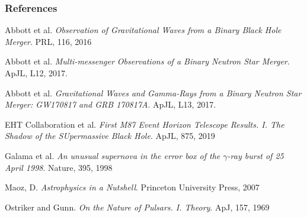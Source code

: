 \documentclass{beamer}
\begin{document}
\begin{frame}[allowframebreaks]
  \frametitle<presentation>{References}    
  \scriptsize
  \begin{thebibliography}{10}    

  \beamertemplatebookbibitems
    Abbott et al. {\em Observation of Gravitational Waves from a Binary Black Hole Merger}. PRL, 116, 2016
  \beamertemplatearticlebibitems

  \beamertemplatebookbibitems
    Abbott et al. {\em Multi-messenger Observations of a Binary Neutron Star Merger}.
    ApJL, L12, 2017.
  \beamertemplatearticlebibitems

  \beamertemplatebookbibitems
    Abbott et al. {\em Gravitational Waves and Gamma-Rays from a Binary Neutron Star Merger: GW170817 and GRB 170817A}. ApJL, L13, 2017.
  \beamertemplatearticlebibitems

  \beamertemplatebookbibitems
    EHT Collaboration et al.  {\em First M87 Event Horizon Telescope Results. I. The Shadow of the SUpermassive Black Hole}. ApJL, 875, 2019 
  \beamertemplatearticlebibitems

  \beamertemplatebookbibitems
    Galama et al.  {\em An unusual supernova in the error box of the {$\gamma$}-ray burst of 25 April 1998}. Nature, 395, 1998
  \beamertemplatearticlebibitems


  \beamertemplatebookbibitems
    Maoz, D. {\em Astrophysics in a Nutshell}. Princeton University Press, 2007
  \beamertemplatearticlebibitems


  \beamertemplatebookbibitems
    Ostriker and Gunn. {\em On the Nature of Pulsars. I. Theory}. ApJ, 157, 1969
  \beamertemplatearticlebibitems



  \end{thebibliography}
\end{frame}





\end{document}
